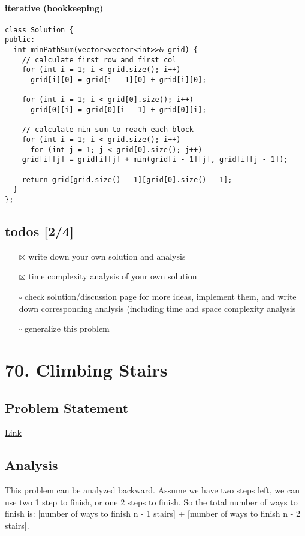 \documentclass[12pt]{article}
\begin{document}
\paragraph{iterative (bookkeeping)}
\label{sec:org253e868}
\begin{verbatim}
class Solution {
public:
  int minPathSum(vector<vector<int>>& grid) {
    // calculate first row and first col 
    for (int i = 1; i < grid.size(); i++)
      grid[i][0] = grid[i - 1][0] + grid[i][0];

    for (int i = 1; i < grid[0].size(); i++)
      grid[0][i] = grid[0][i - 1] + grid[0][i];

    // calculate min sum to reach each block
    for (int i = 1; i < grid.size(); i++)
      for (int j = 1; j < grid[0].size(); j++)
	grid[i][j] = grid[i][j] + min(grid[i - 1][j], grid[i][j - 1]);

    return grid[grid.size() - 1][grid[0].size() - 1];
  }
};
\end{verbatim}
\subsection{todos [2/4]}
\label{sec:org60a221a}
\begin{itemize}
\item[{$\boxtimes$}] write down your own solution and analysis
\item[{$\boxtimes$}] time complexity analysis of your own solution
\item[{$\square$}] check solution/discussion page for more ideas, implement them, and write down corresponding analysis (including time and space complexity analysis
\item[{$\square$}] generalize this problem
\end{itemize}
\section{70. Climbing Stairs}
\label{sec:orgdd993c0}
\subsection{Problem Statement}
\label{sec:org1e7fc65}
\href{https://leetcode.com/problems/climbing-stairs/}{Link}
\subsection{Analysis}
\label{sec:org1bcf2dd}
This problem can be analyzed backward. Assume we have two steps left, we can use two 1 step to finish, or one 2 steps to finish. So the total number of ways to finish is: [number of ways to finish n - 1 stairs] + [number of ways to finish n - 2 stairs].
\end{document}
